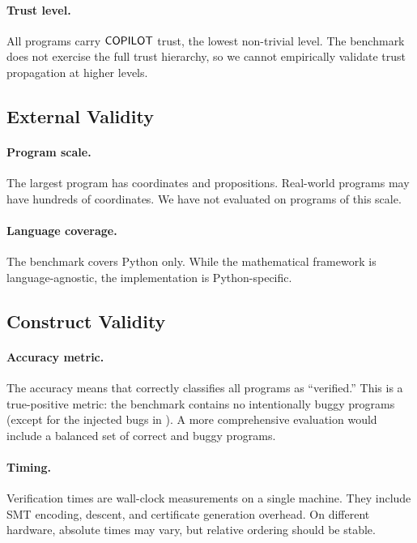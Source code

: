 \documentclass[11pt]{article}
\begin{document}
\paragraph{Trust level.}
All programs carry $\mathsf{COPILOT}$ trust, the lowest non-trivial level.
The benchmark does not exercise the full trust hierarchy, so we cannot
empirically validate trust propagation at higher levels.

\subsection{External Validity}

\paragraph{Program scale.}
The largest program has \expCoordsMax{} coordinates and
\expPropsMax{} propositions.  Real-world programs may have hundreds
of coordinates.  We have not evaluated \JuGeo{} on programs of this
scale.

\paragraph{Language coverage.}
The benchmark covers Python only.  While the mathematical framework
is language-agnostic, the implementation is Python-specific.

\subsection{Construct Validity}

\paragraph{Accuracy metric.}
The \expAccuracy{} accuracy means that \JuGeo{} correctly classifies
all programs as ``verified.''  This is a true-positive metric: the
benchmark contains no intentionally buggy programs (except for the
injected bugs in ).  A more comprehensive evaluation
would include a balanced set of correct and buggy programs.

\paragraph{Timing.}
Verification times are wall-clock measurements on a single machine.
They include SMT encoding, descent, and certificate generation
overhead.  On different hardware, absolute times may vary, but
relative ordering should be stable.
\end{document}

